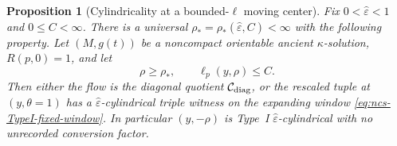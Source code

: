 \documentclass[10pt]{coll-l}
\newtheorem{proposition}[theorem]{Proposition}
\theoremstyle{definition}
\theoremstyle{remark}
\numberwithin{section}{chapter}
\numberwithin{equation}{chapter}
\begin{document}
\begin{proposition}[Cylindricality at a bounded-$\ell$ moving center]
\label{prop:ncs-moving-basepoint-cylinder}
Fix $0<\widehat\varepsilon<1$ and $0\leq C<\infty$.  There is a universal
$\rho_*=\rho_*(\widehat\varepsilon,C)<\infty$ with the following property.
Let $(M,g(t))$ be a noncompact orientable ancient $\kappa$-solution,
$R(p,0)=1$, and let
\begin{equation}
             \rho\geq\rho_*,\qquad \ell_p(y,\rho)\leq C.       \label{eq:ncs-moving-prop-hypotheses}
\end{equation}
Then either the flow is the diagonal quotient $\mathcal C_{\rm diag}$, or
the rescaled tuple at $(y,\theta=1)$ has a
$\widehat\varepsilon$-cylindrical triple witness on the expanding window
\eqref{eq:ncs-TypeI-fixed-window}.  In particular $(y,-\rho)$ is Type~I
$\widehat\varepsilon$-cylindrical with no unrecorded conversion factor.
\end{proposition}
\end{document}

